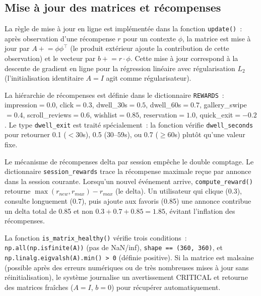 \subsection{Mise à jour des matrices et récompenses}

La règle de mise à jour en ligne est implémentée dans la fonction \texttt{update()}~:
après observation d'une récompense $r$ pour un contexte $\phi$, la matrice est mise à jour
par $A \mathrel{+}= \phi \phi^\top$ (le produit extérieur ajoute la contribution de cette
observation) et le vecteur par $b \mathrel{+}= r \cdot \phi$. Cette mise à jour correspond
à la descente de gradient en ligne pour la régression linéaire avec régularisation $L_2$
(l'initialisation identitaire $A = I$ agit comme régularisateur).

La hiérarchie de récompenses est définie dans le dictionnaire \texttt{REWARDS}~:
impression$=0.0$, click$=0.3$, dwell\_30s$=0.5$, dwell\_60s$=0.7$, gallery\_swipe$=0.4$,
scroll\_reviews$=0.6$, wishlist$=0.85$, reservation$=1.0$, quick\_exit$=-0.2$. Le type
\texttt{dwell\_exit} est traité spécialement~: la fonction vérifie
\texttt{dwell\_seconds} pour retourner 0.1 ($<30$s), 0.5 ($30$--$59$s), ou 0.7
($\geq 60$s) plutôt qu'une valeur fixe.

Le mécanisme de récompenses delta par session empêche le double comptage. Le dictionnaire
\texttt{session\_rewards} trace la récompense maximale reçue par annonce dans la session
courante. Lorsqu'un nouvel événement arrive, \texttt{compute\_reward()} retourne
$\max(r_{new}, r_{max}) - r_{max}$ (le delta). Un utilisateur qui clique (0.3), consulte
longuement (0.7), puis ajoute aux favoris (0.85) une annonce contribue un delta total de
0.85 et non $0.3 + 0.7 + 0.85 = 1.85$, évitant l'inflation des récompenses.

La fonction \texttt{is\_matrix\_healthy()} vérifie trois conditions~:
\texttt{np.all(np.isfinite(A))} (pas de NaN/inf), \texttt{shape == (360, 360)},
et \texttt{np.linalg.eigvalsh(A).min() > 0} (définie positive). Si la matrice est
malsaine (possible après des erreurs numériques ou de très nombreuses mises à jour sans
réinitialisation), le système journalise un avertissement CRITICAL et retourne des matrices
fraîches ($A = I$, $b = 0$) pour récupérer automatiquement.

